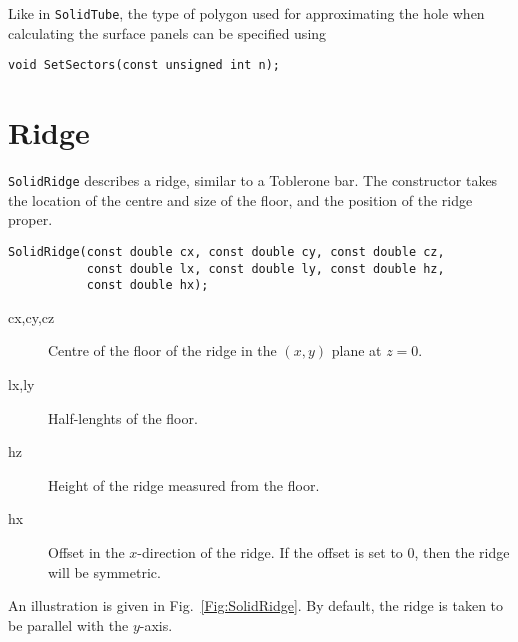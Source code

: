 Like in \texttt{SolidTube}, the type of polygon used for approximating the 
hole when calculating the surface panels can be specified using 
\begin{lstlisting}
void SetSectors(const unsigned int n);
\end{lstlisting}

\section{Ridge}
\texttt{SolidRidge} describes a ridge, similar to a Toblerone bar. 
The constructor takes the location of the centre and size of the floor, 
and the position of the ridge proper.
\begin{lstlisting}
SolidRidge(const double cx, const double cy, const double cz,
           const double lx, const double ly, const double hz,
           const double hx);
\end{lstlisting} 
\begin{description}
  \item[cx,cy,cz] Centre of the floor of the ridge in the $\left(x,y\right)$ plane at $z=0$.
  \item[lx,ly] Half-lenghts of the floor.
  \item[hz] Height of the ridge measured from the floor.
  \item[hx] Offset in the $x$-direction of the ridge. If the offset is set to 0, then the ridge will be symmetric.  
\end{description}
An illustration is given in Fig.~\ref{Fig:SolidRidge}.
By default, the ridge is taken to be parallel with the $y$-axis.
